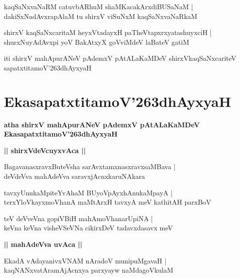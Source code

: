 \documentclass[twoside,12pt,openright]{book}
\def\S{\char'263}
\newcounter{shloka}[chapter]
\def\uvaca#1{\centerline{{\large\textbf{#1}}}}
\begin{document}
\begin{shloka}%
kaqSaNxvaNaRM catuvbARhuM shaMKacakArxdiBUSaNaM |\\
dakiSxNadAvxrapAlaM tu shirxV viSuNxM kaqSaNxvaNaRkaM 
\end{shloka}

\begin{shloka}%
shirxV kaqSaNxcaritaM heyxVtadayxH paTheVtapxrxyatashuyxciH |\\
shurxNuyAdAvxpi yoV BakAtxyX goVviMdeV laBateV gatiM 
\end{shloka}

\begin{center}
iti shirxV mahApurANeV pAdemxV pAtALaKaMDeV shirxVkaqSaNxcariteV  
sapatxtitamoV\S dhAyxyaH
\end{center}

\chapter{EkasapatxtitamoV\S dhAyxyaH}

\begin{center}
{\LARGE\bfseries atha shirxV mahApurANeV pAdemxV pAtALaKaMDeV EkasapatxtitamoV\S dhAyxyaH}
\end{center}

\uvaca{|| shirxVdeVcuyxvAca ||}

\begin{shloka}%
BagavanasxravxButeVsha sarAvxtamxnasxravxsaMBava |\\
deVdeVva mahAdeVva saravxjAcnxkaruNAkara 
\end{shloka}

\begin{shloka}%
tavxyUnukaMpiteYvAhaM BUyoVpAyxhAnukaMpayA |\\
terxYloVkayxmoVhanA maMtArxH tavxyA meV kathitAH parxBoV 
\end{shloka}

\begin{shloka}%
teV deVveVna gopiVBiH mahAmoVhanarUpiNA |\\
keVna keVna visheVSeVNa cikirxDeV tadavxdasavx meV 
\end{shloka}

\uvaca{|| mahAdeVva uvAca ||}

\begin{shloka}%
EkadA vAdayanivxVNAM nAradoV munipuMgavaH |\\
kaqNANxvatAramAjAcnxya parxyayw naMdagoVkulaM 
\end{shloka}
\end{document}
